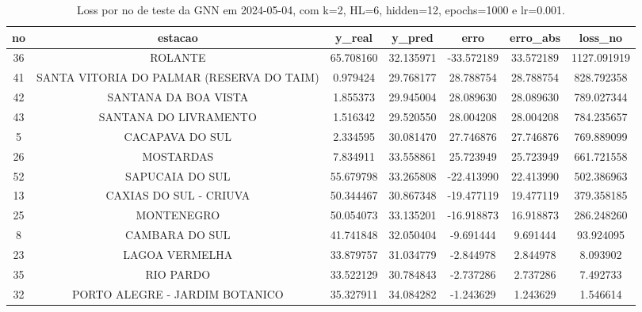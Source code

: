 \begin{table}[h]
\centering
\caption{Loss por no de teste da GNN em 2024-05-04, com k=2, HL=6, hidden=12, epochs=1000 e lr=0.001.}
\label{tab:gnn_loss_k2_hl6_h12_e1000_d20240504}
\begin{tabular}{ccccccc}
\toprule
no & estacao & y\_real & y\_pred & erro & erro\_abs & loss\_no \\
\midrule
36 & ROLANTE & 65.708160 & 32.135971 & -33.572189 & 33.572189 & 1127.091919 \\
41 & SANTA VITORIA DO PALMAR (RESERVA DO TAIM) & 0.979424 & 29.768177 & 28.788754 & 28.788754 & 828.792358 \\
42 & SANTANA DA BOA VISTA & 1.855373 & 29.945004 & 28.089630 & 28.089630 & 789.027344 \\
43 & SANTANA DO LIVRAMENTO & 1.516342 & 29.520550 & 28.004208 & 28.004208 & 784.235657 \\
5 & CACAPAVA DO SUL & 2.334595 & 30.081470 & 27.746876 & 27.746876 & 769.889099 \\
26 & MOSTARDAS & 7.834911 & 33.558861 & 25.723949 & 25.723949 & 661.721558 \\
52 & SAPUCAIA DO SUL & 55.679798 & 33.265808 & -22.413990 & 22.413990 & 502.386963 \\
13 & CAXIAS DO SUL - CRIUVA & 50.344467 & 30.867348 & -19.477119 & 19.477119 & 379.358185 \\
25 & MONTENEGRO & 50.054073 & 33.135201 & -16.918873 & 16.918873 & 286.248260 \\
8 & CAMBARA DO SUL & 41.741848 & 32.050404 & -9.691444 & 9.691444 & 93.924095 \\
23 & LAGOA VERMELHA & 33.879757 & 31.034779 & -2.844978 & 2.844978 & 8.093902 \\
35 & RIO PARDO & 33.522129 & 30.784843 & -2.737286 & 2.737286 & 7.492733 \\
32 & PORTO ALEGRE - JARDIM BOTANICO & 35.327911 & 34.084282 & -1.243629 & 1.243629 & 1.546614 \\
\bottomrule
\end{tabular}
\end{table}

